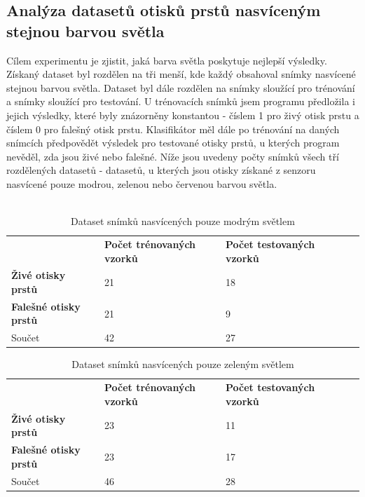 \subsection{Analýza datasetů otisků prstů nasvíceným stejnou barvou světla}
Cílem experimentu je zjistit, jaká barva světla poskytuje nejlepší výsledky. Získaný dataset byl rozdělen na tři menší, kde každý obsahoval snímky nasvícené stejnou barvou světla. Dataset byl dále rozdělen na snímky sloužící pro trénování a snímky sloužící pro testování. U trénovacích snímků jsem programu předložila i jejich výsledky, které byly znázorněny konstantou - číslem 1 pro živý otisk prstu a číslem 0 pro falešný otisk prstu. Klasifikátor měl dále po trénování na daných snímcích předpovědět výsledek pro testované otisky prstů, u kterých program nevěděl, zda jsou živé nebo falešné. Níže jsou uvedeny počty snímků všech tří rozdělených datasetů - datasetů, u kterých jsou otisky získané z senzoru nasvícené pouze modrou, zelenou nebo červenou barvou světla. \\\

\capstartfalse
\begin{table}[!htbp]
\begin{tabular}{|l|l|l|ll}
\cline{1-3}
\textbf{} & \textbf{Počet trénovaných vzorků} & \textbf{Počet testovaných vzorků} &  &  \\ \cline{1-3}
\textbf{Živé otisky prstů}        & 21                                & 18                                &  &  \\ \cline{1-3}
\textbf{Falešné otisky prstů}     & 21                                & 9                                 &  &  \\ \cline{1-3}
Součet                            & 42                                & 27                                &  &  \\ \cline{1-3}
\end{tabular}
\caption{Dataset snímků nasvícených pouze modrým světlem}
\end{table}
\capstarttrue

\capstartfalse
\begin{table}[!htbp]
\begin{tabular}{|l|l|l|ll}
\cline{1-3}
\textbf{}                     & \textbf{Počet trénovaných vzorků} & \textbf{Počet testovaných vzorků} &  &  \\ \cline{1-3}
\textbf{Živé otisky prstů}    & 23                                & 11                                &  &  \\ \cline{1-3}
\textbf{Falešné otisky prstů} & 23                                & 17                                &  &  \\ \cline{1-3}
Součet                        & 46                                & 28                                &  &  \\ \cline{1-3}
\end{tabular}
\caption{Dataset snímků nasvícených pouze zeleným světlem}
\end{table}
\capstarttrue

